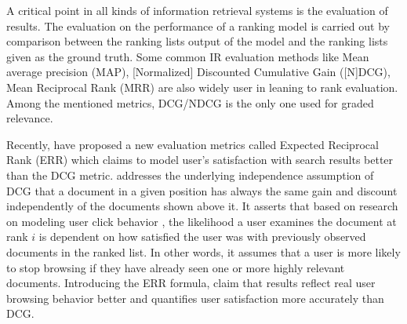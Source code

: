 A critical point in all kinds of information retrieval systems is the evaluation of results. The evaluation on the performance of a ranking model is carried out by comparison between the ranking lists output of the model and the ranking lists given as the ground truth. Some common IR evaluation methods like Mean average precision (MAP), [Normalized] Discounted Cumulative Gain ([N]DCG), Mean Reciprocal Rank (MRR) are also widely user in leaning to rank evaluation. Among the mentioned metrics, DCG/NDCG is the only one used for graded relevance.

Recently, \cite{l2r-err} have proposed a new evaluation metrics called Expected Reciprocal Rank (ERR) which claims to model user's satisfaction with search results better than the DCG metric. \cite{l2r-err} addresses the underlying independence assumption of DCG that a document in a given position has always the same gain and discount independently of the documents shown above it. It asserts that based on research on modeling user click behavior \cite{l2r-clickmodel1,l2r-clickmodel2}, the likelihood a user examines the document at rank $i$ is dependent on how satisfied the user was with previously observed documents in the ranked list. In other words, it assumes that a user is more likely to stop browsing if they have already seen one or more highly relevant documents. Introducing the ERR formula, \cite{l2r-err} claim that results reflect real user browsing behavior better and quantifies user satisfaction more accurately than DCG.
